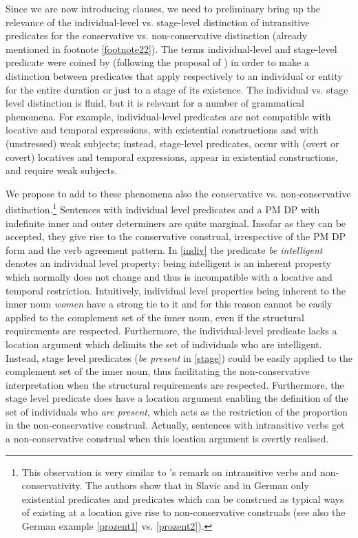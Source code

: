 \documentclass[charis, linguex]{glossa}
\begin{document}
Since we are now introducing clauses, we need to preliminary bring up the relevance of the individual-level vs. stage-level distinction of intransitive predicates for the conservative vs. non-conservative distinction (already mentioned in footnote \ref{footnote22}). The terms individual-level and stage-level predicate were coined by \citet{car77a} (following the proposal of \citealt{mil74}) in order to make a distinction between predicates that apply respectively to an individual or entity for the entire duration or just to a stage of its existence. The individual vs. stage level distinction is fluid, but it is relevant for a number of grammatical phenomena. For example, individual-level predicates are not compatible with locative and temporal expressions, with existential constructions and with (unstressed) weak subjects; instead, stage-level predicates, occur with (overt or covert) locatives and temporal expressions, appear in existential constructions, and require weak subjects. 

We propose to add to these phenomena also the conservative vs. non-conservative distinction.\footnote{This observation is very similar to \citeauthor{geh23}'s \citeyearpar[p.26]{geh23} remark on intransitive verbs and non-conservativity. The authors show that  in Slavic and in German only existential predicates and predicates which can be construed as typical ways of existing at a location give rise to non-conservative construals (see also the German example \ref{prozent1} vs. \ref{prozent2}).} Sentences with individual level predicates and a PM DP with indefinite inner and outer determiners are quite marginal. Insofar as they can be accepted, they give rise to the
conservative construal, irrespective of the PM DP form and the verb agreement pattern. In \ref{indiv} the predicate \textit{be intelligent} denotes an individual level property: being intelligent is an inherent property which normally does not change and thus is incompatible with a locative and temporal restriction. Intuitively, individual level properties being inherent to the inner noun \textit{women} have a strong tie to it and for this reason cannot be easily applied to the complement set of the inner noun, even if the structural requirements are respected. Furthermore, the individual-level predicate lacks a location argument \citep[p.136]{kra95} which delimits the set of individuals who are intelligent. Instead, stage level predicates (\textit{be present} in \ref{stage}) could be easily applied to the complement set of the inner noun, thus facilitating the non-conservative interpretation when the structural requirements are respected. Furthermore, the stage level predicate does have a location argument \citep[p.136]{kra95} enabling the definition of the set of individuals who \textit{are present}, which acts as the restriction of the proportion in the non-conservative construal. Actually, sentences with intransitive verbs get a non-conservative construal when this location argument is overtly realised.
\end{document}
